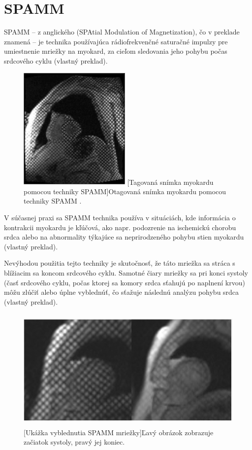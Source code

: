 \section {SPAMM}
SPAMM -- z anglického (SPAtial Modulation of Magnetization), čo v preklade znamená  -- je technika používajúca rádiofrekvenčné saturačné impulzy pre umiestnenie mriežky na myokard, za cieľom sledovania jeho pohybu počas srdcového cyklu \cite{spamm_description} (vlastný preklad).

\begin {figure}[H]
        \centering
        \includegraphics[height=6cm]{media/heart/tagged_heart.png}
        \captionsetup{justification=centering}
        [Tagovaná snímka myokardu pomocou techniky SPAMM]{Otagovaná snímka myokardu pomocou techniky SPAMM \cite{spamm_description}.}
\end {figure}

V súčasnej praxi sa SPAMM technika používa v situáciách, kde informácia o kontrakcii myokardu je kľúčová, ako napr. podozrenie na ischemickú chorobu srdca alebo na abnormality týkajúce sa neprirodzeného pohybu stien myokardu \cite{spamm_description} (vlastný preklad).

Nevýhodou použitia tejto techniky je skutočnosť, že táto mriežka sa stráca s blížiacim sa koncom srdcového cyklu. Samotné čiary mriežky sa pri konci systoly (časť srdcového cyklu, počas ktorej sa komory srdca sťahujú po naplnení krvou) môžu zlúčiť alebo úplne vyblednúť, čo sťažuje následnú analýzu pohybu srdca \cite{spamm_description} (vlastný preklad).

\begin {figure}[H]
        \centering
        \includegraphics[height=6cm]{media/heart/early_late_systole.png}
        \captionsetup{justification=centering}
        [Ukážka vyblednutia SPAMM mriežky]{Ľavý obrázok zobrazuje začiatok systoly, pravý jej koniec.}
\end {figure}

\clearpage